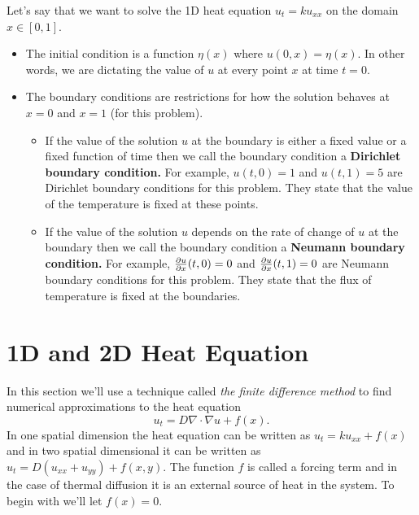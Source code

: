 \begin{definition}
    Let's say that we want to solve the 1D heat equation $u_t = k u_{xx}$ on the domain $x
    \in [0,1]$.  
    \begin{itemize}
        \item The initial condition is a function $\eta(x)$ where $u(0,x) = \eta(x)$.  In
            other words, we are dictating the value of $u$ at every point $x$ at time
            $t=0$. 
        \item The boundary conditions are restrictions for how the solution behaves at
            $x=0$ and $x=1$ (for this problem).  
            \begin{itemize}
                \item If the value of the solution $u$ at the boundary is either a fixed value or a fixed
                    function of time then we call the boundary condition a {\bf Dirichlet
                    boundary condition.}  For example, $u(t,0) = 1$ and $u(t,1) = 5$ are
                    Dirichlet boundary conditions for this problem.  They state that the
                    value of the temperature is fixed at these points.
                \item If the value of the solution $u$ depends on the rate of change of
                    $u$ at the boundary then we call the boundary condition a {\bf Neumann
                    boundary condition.}  For example, $\frac{\partial{u}}{\partial{x}}(t,0) = 0$ and
                    $\frac{\partial{u}}{\partial{x}}(t,1) = 0$ are Neumann boundary conditions for this problem.
                    They state that the flux of temperature is fixed at the boundaries.
            \end{itemize}
            
    \end{itemize}
\end{definition}



\newpage\section{1D and 2D Heat Equation}
In this section we'll use a technique called {\it the finite difference method} to find
numerical approximations to the heat equation
\[ u_t = D \nabla \cdot \nabla u + f(x). \]
In one spatial dimension the heat equation can be written as $u_t = ku_{xx} + f(x)$ and in
two spatial dimensional it can be written as $u_t = D \left( u_{xx} + u_{yy} \right) +
f(x,y)$.  The function $f$ is called a forcing term and in the case of thermal diffusion
it is an external source of heat in the system.  To begin with we'll let $f(x) = 0$.

